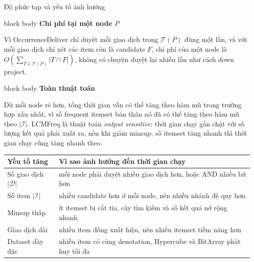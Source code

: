 \documentclass[9pt, aspectratio=169]{beamer}
\newenvironment{quietblock}[1]{%
  \begin{beamercolorbox}[wd=\linewidth,sep=5pt,rounded=true]{block body}
  {\color{psdearblue}\bfseries #1}\par\vspace{2pt}\footnotesize
}{%
  \end{beamercolorbox}
}
\begin{document}
\begin{frame}{Độ phức tạp và yếu tố ảnh hưởng}
  \begin{quietblock}{Chi phí tại một node $P$}
    Vì OccurrenceDeliver chỉ duyệt mỗi giao dịch trong $\mathcal T(P)$ đúng
    một lần, và với mỗi giao dịch chỉ xét các item còn là candidate $F$,
    chi phí của một node là $O\!\left(\sum_{T\in\mathcal T(P)} |T\cap
    F|\right)$, không có chuyện duyệt lại nhiều lần như cách down project.
  \end{quietblock}

  \vspace{0.2cm}
  \begin{quietblock}{Toàn thuật toán}
    Dù mỗi node rẻ hơn, tổng thời gian vẫn có thể tăng theo hàm mũ trong
    trường hợp xấu nhất, vì số frequent itemset bản thân nó đã có thể tăng
    theo hàm mũ theo $|\mathcal I|$. LCMFreq là thuật toán
    \emph{output sensitive}: thời gian chạy gắn chặt với số lượng kết quả
    phải xuất ra, nên khi giảm minsup, số itemset tăng nhanh thì thời gian
    chạy cũng tăng nhanh theo.
  \end{quietblock}

  \vspace{0.2cm}
  \centering
  \small
  \begin{tabular}{@{}ll@{}}
    \toprule
    Yếu tố tăng & Vì sao ảnh hưởng đến thời gian chạy \\
    \midrule
    Số giao dịch $|\mathcal D|$ & mỗi node phải duyệt nhiều giao dịch hơn, hoặc AND nhiều bit hơn \\
    Số item $|\mathcal I|$ & nhiều candidate hơn ở mỗi node, nên nhiều nhánh đệ quy hơn \\
    Minsup thấp & ít itemset bị cắt tỉa, cây tìm kiếm và số kết quả nở rộng nhanh \\
    Giao dịch dài & nhiều item đồng xuất hiện, nên nhiều itemset tiềm năng hơn \\
    Dataset dày đặc & nhiều item có cùng denotation, Hypercube và BitArray phát huy tối đa \\
    \bottomrule
  \end{tabular}
\end{frame}
\end{document}
